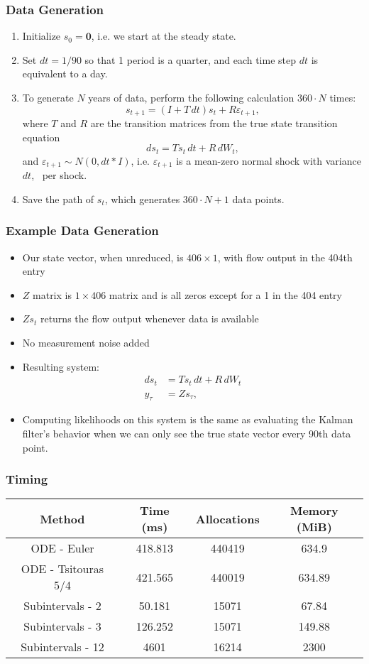 \documentclass{beamer}
\newcommand{\bfzero}{\mathbf{0}}
\begin{document}
\begin{frame}
  \frametitle{Data Generation}
\begin{enumerate}
\item Initialize $s_0 = \bfzero$, i.e. we start at the steady state.
\item Set $dt = 1/90$ so that 1 period is a quarter, and each time step $dt$ is equivalent to a day.
\item To generate $N$ years of data, perform the following calculation $360\cdot N$ times:
\[s_{t+1} = (I + T\,dt)s_t + R \varepsilon_{t+1},  \]
where $T$ and $R$ are the transition matrices from the true state transition equation
\[ds_t = Ts_t\, dt + R\, dW_t,  \]
and $\varepsilon_{t+1}\sim N(0, dt * I)$, i.e. $\varepsilon_{t+1}$ is a mean-zero normal shock with variance $dt$, \
per shock.
\item Save the path of $s_t$, which generates $360\cdot N + 1$ data points.
\end{enumerate}
\end{frame}
\begin{frame}
  \frametitle{Example Data Generation}
  \begin{itemize}
  \item Our state vector, when unreduced, is $406\times 1$, with flow output in the 404th entry
  \item $Z$ matrix is $1\times 406$ matrix and is all zeros except for a 1 in the 404 entry
  \item $Zs_t$ returns the flow output whenever data is available
  \item No measurement noise added
  \item Resulting system:
    \begin{align*}
      ds_t & = Ts_t\,dt + R\, dW_t\\
      y_\tau & = Zs_\tau,
    \end{align*}
  \item Computing likelihoods on this system is the same as evaluating the Kalman filter's behavior when we can only see the true state vector every 90th data point.
  \end{itemize}
\end{frame}

\begin{frame}
  \frametitle{Timing}
\begin{center}
  \begin{tabular}{|c|c|c|c|}
    \hline
    Method & Time (ms) & Allocations & Memory (MiB)\\
\hline
    ODE - Euler & 418.813  & 440419 & 634.9 \\
    ODE - Tsitouras 5/4 & 421.565 & 440019  & 634.89\\
    Subintervals - 2  & 50.181 & 15071 & 67.84 \\
    Subintervals - 3  & 126.252 & 15071 & 149.88\\
    Subintervals - 12 & 4601 & 16214 & 2300\\
\hline
  \end{tabular}
\end{center}
\end{frame}
\end{document}
